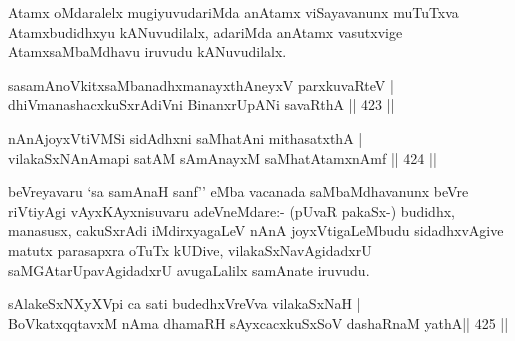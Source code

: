 \begin{artha}
Atamx oMdaralelx mugiyuvudariMda anAtamx viSayavanunx muTuTxva Atamxbudidhxyu kANuvudilalx, adariMda anAtamx vasutxvige AtamxsaMbaMdhavu iruvudu kANuvudilalx.
\end{artha}



\begin{shl}
sasamAnoVkitxsaMbanadhxmanayxthA\s neyxV parxkuvaRteV | \\
\footnotemark[1]{}dhiVmanashacxkuSxrAdiVni BinanxrUpANi savaRthA \hfill||  423 ||  
\end{shl}

\begin{shl}
nAnAjoyxVtiVMSi sidAdhxni saMhatAni mithasatxthA | \\
vilakaSxNAnAmapi satAM sAmAnayxM saMhatAtamxnAmf \hfill||  424 ||  
\end{shl}

\begin{artha}
beVreyavaru `sa samAnaH sanf'' eMba vacanada saMbaMdhavanunx beVre riVtiyAgi vAyxKAyxnisuvaru adeVneMdare:- (pUvaR pakaSx-) budidhx, manasusx, cakuSxrAdi iMdirxyagaLeV nAnA joyxVtigaLeMbudu sidadhxvAgive matutx parasapxra oTuTx kUDive, vilakaSxNavAgidadxrU saMGAtarUpavAgidadxrU avugaLalilx samAnate iruvudu.
\end{artha}


\begin{shl}
sAlakeSxNXyXV\s pi ca sati budedhxVreVva vilakaSxNaH | \\
BoVkatxqqtavxM nAma dhamaRH sAyxcacxkuSxSoV dashaRnaM yathA\hfill ||  425 ||  
\end{shl}

